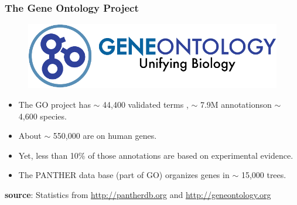 \documentclass[aspectratio=169, 9pt, handout]{beamer}
\begin{document}
\begin{frame}[label=geneontology]
\frametitle{The Gene Ontology Project}

\begin{figure}
\includegraphics[width=.5\linewidth]{go-logo.png}
\end{figure}
\pause
\begin{itemize}
\item The GO project has $\sim$ 44,400 validated terms \pause \hyperlink{go-functions-types}{}, $\sim$ 7.9M annotations\pause on $\sim$ 4,600 species.\pause
\item About $\sim$ 550,000 are on human genes.\pause
\item Yet, less than 10\% of those annotations are based on experimental evidence.\pause %
\item The PANTHER data base (part of GO) organizes genes in $\sim$ 15,000 trees.
\end{itemize}

\vfill
\hfill \small \textbf{source}: Statistics from \url{http://pantherdb.org} and \url{http://geneontology.org}\normalsize

\end{frame}


\newcommand{\oinclude}[2]{\only<#1>{\texttt{[image: \#2]}}}
\end{document}
